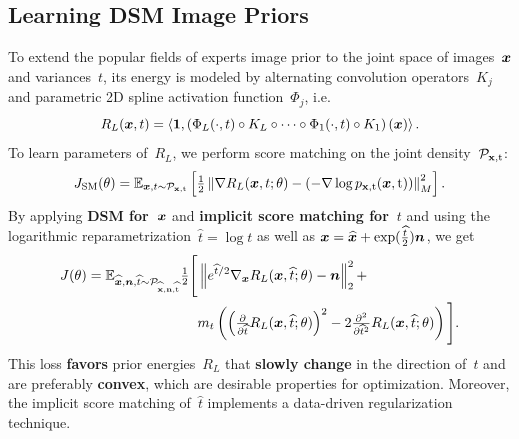 \documentclass[a1paper,fleqn]{betterportraitposter}
\renewcommand{\emph}[1]{\textbf{\color{myblue}#1}}
\newcommand{\norm}[1]{\left\Vert#1\right\Vert}
\newcommand{\scal}[2]{\left\langle#1,#2\right\rangle}
\renewcommand{\vec}[1]{\mathbf{#1}}
\newcommand{\dist}[1]{\mathcal{P}_{#1}}
\theoremstyle{plain}
\begin{document}
{\begin{multicols}{2}
\section{Learning DSM Image Priors}
To extend the popular fields of experts image prior to the joint space of images~${\bm{x}}$ and variances~$t$, its energy is modeled by alternating convolution operators~$K_j$ and parametric 2D spline activation function~$\Phi_j$, i.e.
\[
R_L(\vx,t) = \scal{\vec{1}}{\left(\Phi_L(\cdot,t)\circ K_L\circ\cdots\circ\Phi_1(\cdot, t) \circ K_1\right)(\vx)}.
\]
To learn parameters of~$R_L$, we perform score matching on the joint density~$\dist{\rvx,\rt}$:
\[
J_\mathrm{SM}(\theta)=\E_{\vx,t\sim\dist{\rvx,\rt}}\left[\tfrac12\norm{\nabla R_L(\vx,t;\theta) -\left(- \nabla\log p_{\rvx,\rt}(\vx,\rt)\right)}_M^2\right].
\]
By applying \emph{DSM for~${\bm{x}}$} and \emph{implicit score matching for~$t$} and using the logarithmic reparametrization~$\widehat{t}=\log t$ as well as ${\bm{x}}=\widehat{{\bm{x}}}+\exp(\tfrac{\widehat{t}}{2}){\bm{n}}$, we get
\begin{align*}    
J(\theta)=\E_{\widehat{\vx},\vn,\widehat{t}\sim\dist{\widehat{\rvx},\rvn,\widehat{\rt}}}\tfrac12\Bigg[&\norm{e^{\widehat{t}/2}\nabla_\vx R_L(\vx,\widehat{t};\theta) -\vn}_2^2+\\
&m_t\left(\left(\tfrac{\partial}{\partial\widehat{t}}R_L(\vx,\widehat{t};\theta)\right)^2 -2\tfrac{\partial^2}{\partial \widehat{t}^2}R_L(\vx,\widehat{t};\theta)\right)\Bigg].
\end{align*}
This loss \emph{favors} prior energies~$R_L$ that \emph{slowly change} in the direction of~$t$ and are preferably \emph{convex}, which are desirable properties for optimization.
Moreover, the implicit score matching of~$\widehat{t}$ implements a data-driven regularization technique. 
\vspace*{-1em}
\begin{center}
\end{center}
\end{multicols}}
\end{document}
